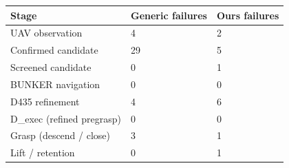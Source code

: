 \begin{tabular}{lll}
\hline
Stage & Generic failures & Ours failures \\
\hline
UAV observation & 4 & 2 \\
Confirmed candidate & 29 & 5 \\
Screened candidate & 0 & 1 \\
BUNKER navigation & 0 & 0 \\
D435 refinement & 4 & 6 \\
D\_exec (refined pregrasp) & 0 & 0 \\
Grasp (descend / close) & 3 & 1 \\
Lift / retention & 0 & 1 \\
\hline
\end{tabular}
